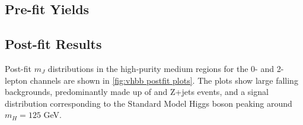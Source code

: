 \subsection{Pre-fit Yields}


\subsection{Post-fit Results}

Post-fit $m_J$ distributions in the high-purity medium \pTV regions for the 0- and 2-lepton channels are shown in \cref{fig:vhbb postfit plots}. The plots show large falling backgrounds, predominantly made up of \Wjets and Z+jets events, and a signal distribution corresponding to the Standard Model Higgs boson peaking around $m_H = 125$ GeV.

